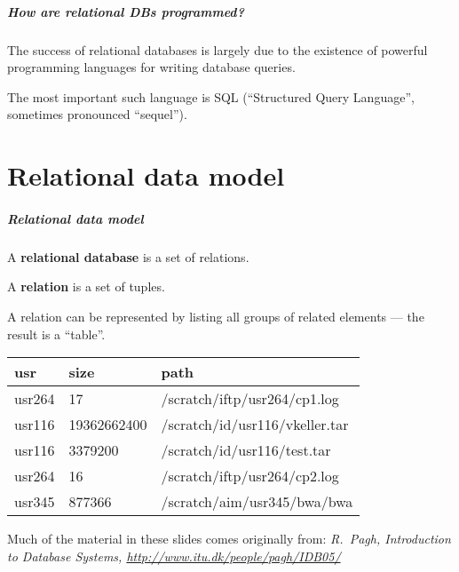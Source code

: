 \documentclass[english,serif,mathserif]{beamer}
\begin{document}
\begin{frame}
  \frametitle{How are relational DBs programmed?}
  The success of relational databases is largely due to the existence of
  powerful programming languages for writing database queries.

  \+ The most important such language is SQL (“Structured Query Language”,
  sometimes pronounced “sequel”).

\end{frame}


\part{Relational data model}
\begin{frame}[fragile]
  \frametitle{Relational data  model}

  \normalsize
  A \textbf{relational database} is a set of relations.

  \+
  A \textbf{relation} is a set of tuples.

  \+
  A relation can be represented by listing all groups of related elements
  --- the result is a ``table''.

  \+
  \small
  \begin{center}
    \begin{tabular}{lll}
      \textbf{usr}
             & \textbf{size}
                           & \textbf{path}                  \\
      \hline
      usr264 &          17 & /scratch/iftp/usr264/cp1.log   \\
      usr116 & 19362662400 & /scratch/id/usr116/vkeller.tar \\
      usr116 &     3379200 & /scratch/id/usr116/test.tar    \\
      usr264 &          16 & /scratch/iftp/usr264/cp2.log   \\
      usr345 &      877366 & /scratch/aim/usr345/bwa/bwa    \\
    \end{tabular}
  \end{center}

  \+
  \smaller
  Much of the material in these slides comes originally from:
  {\em R.~Pagh, Introduction to Database Systems,
    \url{http://www.itu.dk/people/pagh/IDB05/}}
\end{frame}
\end{document}
